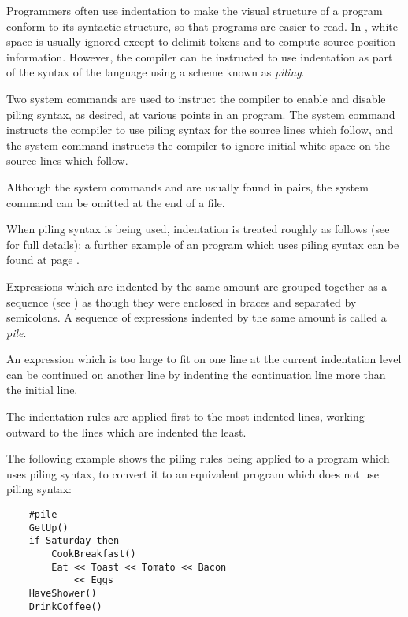 Programmers often use indentation to make the visual structure of a program
conform to its syntactic structure, so that programs are easier to read.
In \asharp{}, white space is usually ignored except to delimit tokens
and to compute source position information.  However, the compiler can
be instructed to use indentation as part of the syntax of the language
using a scheme known as {\em piling}.

Two system commands are used to instruct the compiler to enable and
disable piling syntax, as desired, at various points in an \asharp{}
program.  The system command  instructs
the compiler to use piling syntax for the source lines which follow, and
the system command  instructs the compiler to ignore
initial white space on the source lines which follow.

Although the system commands  and  are
usually found in pairs, the  system command can be
omitted at the end of a file.

When piling syntax is being used, indentation is treated roughly as
follows (see  for full details);
a further example of an \asharp{} program which uses piling syntax can be found
at page \pageref{factorialSample}.

Expressions which are indented by the same amount are grouped together
as a sequence (see ) as though
they were enclosed in braces and separated by semicolons.  A sequence
of expressions indented by the same amount is called a {\em pile}.

\goodbreak
An expression which is too large to fit on one line at the current
indentation level can be continued on another line by indenting the
continuation line more than the initial line.

The indentation rules are applied first to the most indented lines,
working outward to the lines which are indented the least.

The following example shows the piling rules being applied to a program
which uses piling syntax, to convert it to an equivalent program
which does not use piling syntax:

\begin{small}
\begin{verbatim}
    #pile
    GetUp()
    if Saturday then
        CookBreakfast()
        Eat << Toast << Tomato << Bacon
            << Eggs
    HaveShower()
    DrinkCoffee()
\end{verbatim}
\end{small}

